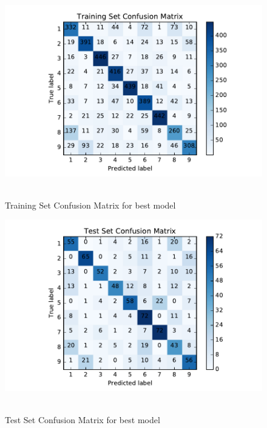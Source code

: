 \begin{figure}[H]
\centering
\includegraphics[width=1.0\textwidth]{./figures/originalTDNNtrain.pdf}\
\caption{\label{fig:BESTtrainMatrix} Training Set Confusion Matrix for best model}
\end{figure}


\begin{figure}[H]
\centering
\includegraphics[width=1.0\textwidth]{./figures/originalTDNNtest.pdf}\
\caption{\label{fig:BESTtestMatrix} Test Set Confusion Matrix for best model}
\end{figure}


\clearpage

%
%
%



